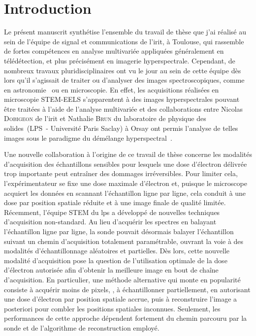 
\chapter{Introduction}
\label{ch:introduction}


 
Le présent manuscrit synthétise l'ensemble du travail de thèse que j'ai réalisé au sein de l'équipe de signal et communications de l'\gls{irit}, à Toulouse, qui rassemble de fortes compétences en analyse multivariée appliquées généralement en télédétection, et plus précisément en imagerie hyperspectrale. Cependant, de nombreux travaux pluridisciplinaires ont vu le jour au sein de cette équipe dès lors qu'il s'agissait de traiter ou d'analyser des images spectroscopiques, comme en astronomie~\cite{guilloteau2020simulated, guilloteau2020fusion} ou en microscopie. En effet, les acquisitions réalisées en microscopie STEM-EELS s'apparentent à des images hyperspectrales pouvant être traitées à l'aide de l'analyse multivariée et des collaborations entre Nicolas \textsc{Dobigeon} de l'\gls{irit} et Nathalie \textsc{Brun} du laboratoire de physique des solides~(LPS~- Université Paris Saclay) à Orsay ont permis l'analyse de telles images sous le paradigme du démélange hyperspectral~\cite{dobigeon2012spectral, dobigeon2016linear}.

Une nouvelle collaboration à l'origine de ce travail de thèse concerne les modalités d'acquisition des échantillons sensibles pour lesquels une dose d'électron délivrée trop importante peut entraîner des dommages irréversibles. Pour limiter cela, l'expérimentateur se fixe une dose maximale d'électron et, puisque le microscope acquiert les données en scannant l'échantillon ligne par ligne, cela conduit à une dose par position spatiale réduite et à une image finale de qualité limitée.
%
Récemment, l'équipe STEM du \gls{lps} a développé de nouvelles techniques d'acquisition non-standard. Au lieu d'acquérir les spectres en balayant l'échantillon ligne par ligne, la sonde pouvait désormais balayer l'échantillon suivant un chemin d'acquisition totalement paramétrable, ouvrant la voie à des modalités d'échantillonnage aléatoires et partielles. 
%
Dès lors, cette nouvelle modalité d'acquisition pose la question de l'utilisation optimale de la dose d'électron autorisée afin d'obtenir la meilleure image en bout de chaîne d'acquisition. 
%
En particulier, une méthode alternative qui monte en popularité consiste à acquérir moins de pixels, \ie{}, à échantillonner partiellement, en autorisant une dose d'électron par position spatiale accrue, puis à reconstruire l'image a posteriori pour combler les positions spatiales inconnues. Seulement, les performances de cette approche dépendent fortement du chemin parcouru par la sonde et de l'algorithme de reconstruction employé.

